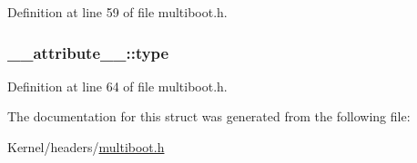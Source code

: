 Definition at line 59 of file multiboot.h.

\hypertarget{struct____attribute_____a467e2efa5015d708e12bfe5166936e89}{
\subsubsection[{type}]{ {\bf \_\-\_\-attribute\_\-\_\-::type}}}
\label{struct____attribute_____a467e2efa5015d708e12bfe5166936e89}


Definition at line 64 of file multiboot.h.



The documentation for this struct was generated from the following file:\begin{DoxyCompactItemize}
\item 
Kernel/headers/\hyperlink{multiboot_8h}{multiboot.h}\end{DoxyCompactItemize}
